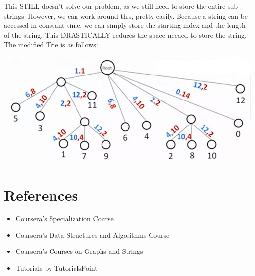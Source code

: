 \documentclass{article}
\theoremstyle{definition}
\theoremstyle{example}
\begin{document}
\vspace{3mm}
This STILL doesn't solve our problem, as we still need to store the entire sub-strings. However, we can work around this, pretty easily. Because a string can be accessed in constant-time, we can simply store the starting index and the length of the string. This DRASTICALLY reduces the space needed to store the string. The modified Trie is as follows:\par
\vspace{3mm}
\begin{center}
    \includegraphics[scale = 0.5]{final.jpg}
\end{center}

\section{\Large References}
\begin{itemize}
    \item Coursera's Specialization Course
    \item Coursera's Data Structures and Algorithms Course
    \item Coursera's Courses on Graphs and Strings
    \item Tutorials by TutorialsPoint
\end{itemize}
\end{document}
